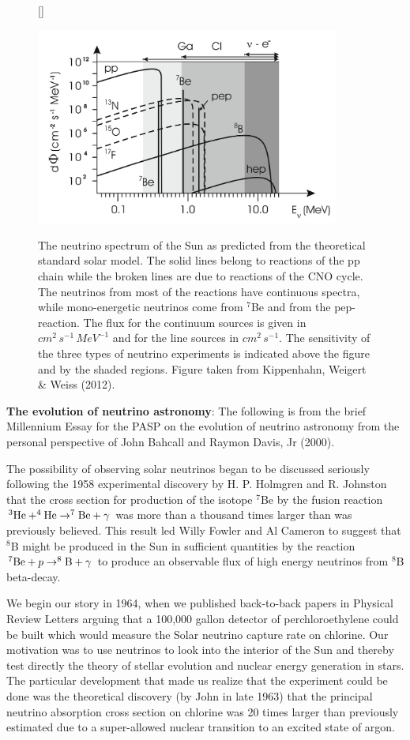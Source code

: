 \documentclass[a4paper,10pt]{article}
\begin{document}
\begin{figure}[t]
    [\FBwidth]
    {\caption{\footnotesize{The neutrino spectrum of the Sun as predicted from the theoretical standard solar model. The solid lines belong to reactions of the pp chain while the broken lines are due to reactions of the CNO cycle. The neutrinos from most of the reactions have continuous spectra, while mono-energetic neutrinos come from $^7$Be and from the pep-reaction. The flux  for the continuum sources is given in $cm^2\,s^{-1}\,MeV^{-1}$ and for the line sources in $cm^2\,s^{-1}$. The sensitivity of the three types of neutrino experiments is indicated above the figure and by the shaded regions. Figure taken from Kippenhahn, Weigert \& Weiss (2012).}}
    \label{fig:neutrinospectrum}}
    {\includegraphics[width=10cm]{figures/NeutrinoSpectrum.png}}
\end{figure}

{\noindent}\textbf{The evolution of neutrino astronomy}: The following is from the brief Millennium Essay for the PASP on the evolution of neutrino astronomy from the personal perspective of John Bahcall and Raymon Davis, Jr (2000).

{\noindent}The possibility of observing solar neutrinos began to be discussed seriously following the 1958 experimental discovery by H. P. Holmgren and R. Johnston that the cross section for production of the isotope $^7$Be by the fusion reaction $^3{\rm He}+^4{\rm He}\rightarrow^7{\rm Be}+\gamma$ was more than a thousand times larger than was previously believed. This result led Willy Fowler and Al Cameron to suggest that $^8$B might be produced in the Sun in sufficient quantities by the reaction $^7{\rm Be}+p\rightarrow^8{\rm B}+\gamma$ to produce an observable flux of high energy neutrinos from $^8$B beta-decay.

{\noindent}We begin our story in 1964, when we published back-to-back papers in Physical Review Letters arguing that a 100,000 gallon detector of perchloroethylene could be built which would measure the Solar neutrino capture rate on chlorine. Our motivation was to use neutrinos to look into the interior of the Sun and thereby test directly the theory of stellar evolution and nuclear energy generation in stars. The particular development that made us realize that the experiment could be done was the theoretical discovery (by John in late 1963) that the principal neutrino absorption cross section on chlorine was 20 times larger than previously estimated due to a super-allowed nuclear transition to an excited state of argon.
\end{document}
